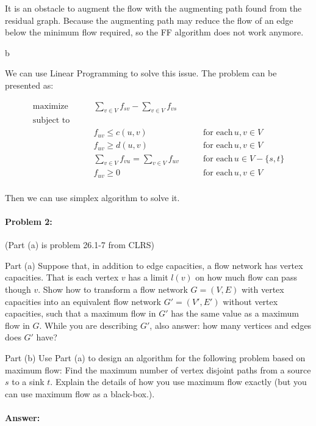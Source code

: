 \documentclass{article}
\begin{document}
It is an obstacle to augment the flow with the augmenting path found from the residual graph. Because the augmenting path may reduce the flow of an edge below the minimum flow required, so the FF algorithm does not work anymore.

b

We can use Linear Programming to solve this issue.
The problem can be presented as:


$$\begin{aligned}
\text{maximize}\qquad&\sum_{v \in V}f_{sv} - \sum_{v \in V}f_{vs}\\
\text{subject to}\qquad&\\
&f_{uv} \le c(u, v) \qquad &\text{for each}\, u,v \in V\\
&f_{uv} \ge d(u, v) \qquad &\text{for each}\, u,v \in V\\
&\sum_{v \in V}f_{vu} = \sum_{v \in V}f_{uv} \qquad &\text{for each}\, u \in V - \{s, t\}\\
&f_{uv} \ge 0 \qquad &\text{for each}\, u,v \in V\\
\end{aligned}$$

Then we can use simplex algorithm to solve it.

\newpage
\paragraph{Problem 2:} (Part (a) is problem 26.1-7 from CLRS)

Part (a) Suppose that, in addition to edge capacities, a flow network has vertex capacities.
That is each vertex $v$ has a limit $l(v)$ on how much flow can pass though $v$. Show
how to transform a flow network $G=(V,E)$ with vertex capacities into an equivalent
flow network $G'=(V',E')$ without vertex capacities, such that a maximum flow in $G'$ has the same value as a maximum flow in $G$. While you are describing $G'$, also answer: how many vertices and edges does $G'$ have?

Part (b) Use Part (a) to design an algorithm for the following problem based on maximum flow: Find the maximum number of vertex disjoint paths from a source $s$ to a sink $t$. Explain the details of how you use maximum flow exactly (but you can use maximum flow as a black-box.).
\paragraph{Answer:}
\paragraph{}
\end{document}
